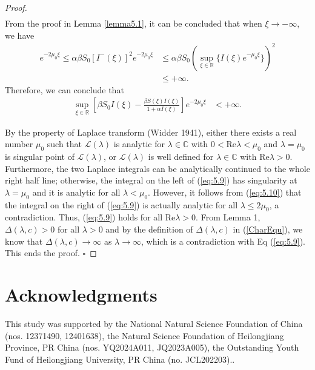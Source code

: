 \documentclass[final,3p,times]{elsarticle}
\numberwithin{equation}{section}
\begin{document}
\begin{proof}
\begin{align}
\end{align}
From the proof in Lemma \ref{lemma5.1}, it can be concluded that when \(\xi\to-\infty\), we have
\begin{align*}
[\beta S_0I(\xi)-\frac{\beta S(\xi)I(\xi)}{1 + \alpha I(\xi)}]e^{-2\mu_0\xi}\leq \alpha\beta S_0 [ I^-(\xi)]^2e^{-2\mu_0\xi}
&\leq\alpha\beta S_0\left(\sup_{\xi\in\mathbb{R}}\{I(\xi)e^{-\mu_0\xi}\}\right)^2\\
&\leq+\infty.
\end{align*}
Therefore, we can conclude that
\begin{align}\label{eq:5.10}
\sup_{\xi\in\mathbb{R}}[\beta S_0I(\xi)-\frac{\beta S(\xi)I(\xi)}{1 + \alpha I(\xi)}]e^{-2\mu_0\xi}&<+\infty.
\end{align}

By the property of Laplace transform (Widder 1941), either there exists a real number \(\mu_0\) such that \(\mathcal{L}(\lambda)\) is analytic for \(\lambda\in\mathbb{C}\) with \(0 < \text{Re}\lambda < \mu_0\) and \(\lambda = \mu_0\) is singular point of \(\mathcal{L}(\lambda)\), or \(\mathcal{L}(\lambda)\) is well defined for \(\lambda\in\mathbb{C}\) with \(\text{Re}\lambda > 0\). Furthermore, the two Laplace integrals can be analytically continued to the whole right half line; otherwise, the integral on the left of (\ref{eq:5.9}) has singularity at \(\lambda = \mu_0\) and it is analytic for all \(\lambda < \mu_0\). However, it follows from (\ref{eq:5.10}) that the integral on the right of (\ref{eq:5.9}) is actually analytic for all \(\lambda\leq2\mu_0\), a contradiction. Thus, (\ref{eq:5.9}) holds for all \(\text{Re}\lambda > 0\). From Lemma 1, \(\Delta(\lambda, c)>0\) for all \(\lambda > 0\) and by the definition of \(\Delta(\lambda, c)\) in (\ref{CharEqu}), we know that \(\Delta(\lambda, c)\to\infty\) as \(\lambda\to\infty\), which is a contradiction with Eq (\ref{eq:5.9}). This ends the proof. \(\square\)
\end{proof}

\section*{Acknowledgments}
This study was supported by the National Natural Science Foundation of China (nos. 12371490, 12401638), the
Natural Science Foundation of Heilongjiang Province, PR China (nos. YQ2024A011, JQ2023A005), the Outstanding
Youth Fund of Heilongjiang University, PR China (no. JCL202203)..
 



\end{document}
